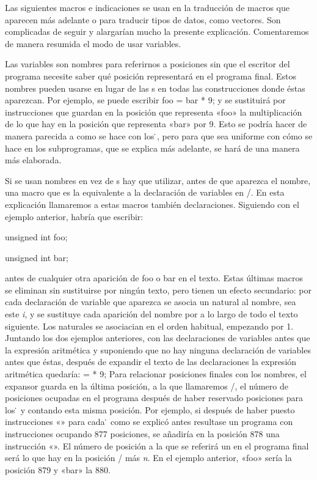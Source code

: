 %
Las siguientes macros e indicaciones se usan en la traducción de macros que aparecen más adelante o
para traducir tipos de datos, como vectores. Son complicadas de seguir y alargarían mucho la
presente explicación. Comentaremos de manera resumida el modo de usar variables.

Las variables son nombres para referirnos a posiciones sin que el escritor del programa necesite
saber qué posición representará en el programa final. Estos nombres pueden usarse en lugar de las
\zeta{}s en todas las construcciones donde éstas aparezcan. Por ejemplo, se puede
escribir
\encaje
{\fcode foo = bar * 9;}
\finencaje
y se sustituirá por instrucciones que guardan en la posición que representa «{\fcode foo}» la
multiplicación de lo que hay en la posición que representa «{\fcode bar}» por 9. Esto se podría
hacer de manera parecida a como se hace con los {\.}, pero para que sea uniforme con
cómo se hace en los subprogramas, que se explica más adelante, se hará de una manera más elaborada.

Si se usan nombres en vez de \zeta{}s hay que utilizar, antes de que aparezca el nombre, una macro que
es la equivalente a la declaración de variables en \C/. En esta explicación llamaremos a estas
macros también declaraciones. Siguiendo con el ejemplo anterior, habría que escribir:
\encaje
{\fcode unsigned int foo;\par {\parskip2pt unsigned int bar;}}
\finencaje
antes de cualquier otra aparición de {\fcode foo} o {\fcode bar} en el texto. Estas últimas macros
se eliminan sin sustituirse por ningún texto, pero tienen un efecto secundario: por cada declaración
de variable que aparezca se asocia un natural al nombre, sea este {\it i}, y se sustituye cada
aparición del nombre por  a lo largo de todo el texto siguiente. Los
naturales se asociacian en el orden habitual, empezando por 1. Juntando los dos ejemplos anteriores,
con las declaraciones de variables antes que la expresión aritmética y suponiendo que no hay ninguna
declaración de variables antes que éstas, después de expandir el texto de las declaraciones la expresión
aritmética quedaría:
\encaje
{\fcode {} =  * 9;}
\finencaje
Para relacionar posiciones finales con los nombres, el expansor guarda en la última posición, a la
que llamaremos \top/, el número de posiciones ocupadas en el programa después de haber reservado
posiciones para los {\.} y contando esta misma posición. Por ejemplo, si después de
haber puesto instrucciones «» para cada {\.} como se explicó antes resultase
un programa con instrucciones ocupando 877 posiciones, se añadiría en la posición 878 una
instrucción «{}». El número de posición a la que se referirá
un  en el programa final será lo que hay en la posición \top/ más {\it
n}. En el ejemplo anterior, «{\fcode foo}» sería la posición 879 y «{\fcode bar}» la 880.

